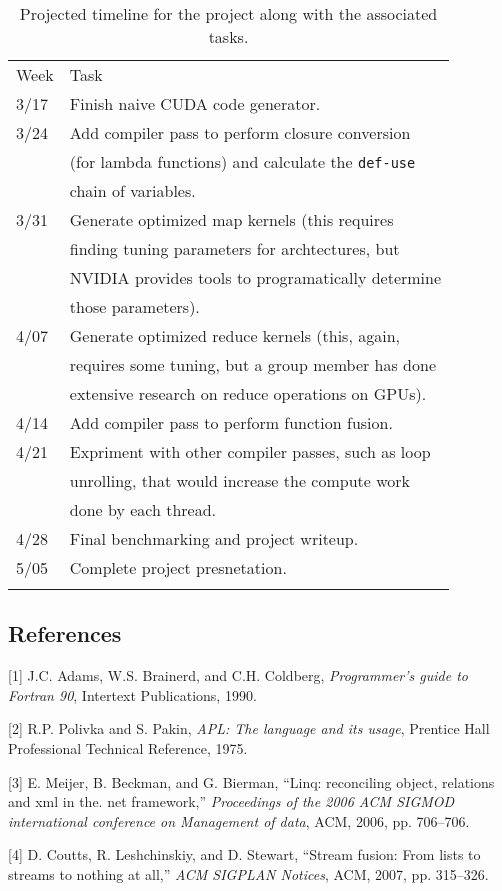 \begin{longtable}[c]{@{}ll@{}}
\hline\noalign{\medskip}
Week & Task
\\\noalign{\medskip}
\hline\noalign{\medskip}
3/17 & Finish naive CUDA code generator.
\\\noalign{\medskip}
3/24 & Add compiler pass to perform closure conversion
\\\noalign{\medskip}
& (for lambda functions) and calculate the \texttt{def-use}
\\\noalign{\medskip}
& chain of variables.
\\\noalign{\medskip}
3/31 & Generate optimized map kernels (this requires
\\\noalign{\medskip}
& finding tuning parameters for archtectures, but
\\\noalign{\medskip}
& NVIDIA provides tools to programatically determine
\\\noalign{\medskip}
& those parameters).
\\\noalign{\medskip}
4/07 & Generate optimized reduce kernels (this, again,
\\\noalign{\medskip}
& requires some tuning, but a group member has done
\\\noalign{\medskip}
& extensive research on reduce operations on GPUs).
\\\noalign{\medskip}
4/14 & Add compiler pass to perform function fusion.
\\\noalign{\medskip}
4/21 & Expriment with other compiler passes, such as loop
\\\noalign{\medskip}
& unrolling, that would increase the compute work
\\\noalign{\medskip}
& done by each thread.
\\\noalign{\medskip}
4/28 & Final benchmarking and project writeup.
\\\noalign{\medskip}
5/05 & Complete project presnetation.
\\\noalign{\medskip}
\hline
\noalign{\medskip}
\caption{Projected timeline for the project along with the associated
tasks.}
\end{longtable}

\subsection{References}

{[}1{]} J.C. Adams, W.S. Brainerd, and C.H. Coldberg, \emph{Programmer's
guide to Fortran 90}, Intertext Publications, 1990.

{[}2{]} R.P. Polivka and S. Pakin, \emph{APL: The language and its
usage}, Prentice Hall Professional Technical Reference, 1975.

{[}3{]} E. Meijer, B. Beckman, and G. Bierman, ``Linq: reconciling
object, relations and xml in the. net framework,'' \emph{Proceedings of
the 2006 ACM SIGMOD international conference on Management of data},
ACM, 2006, pp. 706--706.

{[}4{]} D. Coutts, R. Leshchinskiy, and D. Stewart, ``Stream fusion:
From lists to streams to nothing at all,'' \emph{ACM SIGPLAN Notices},
ACM, 2007, pp. 315--326.
